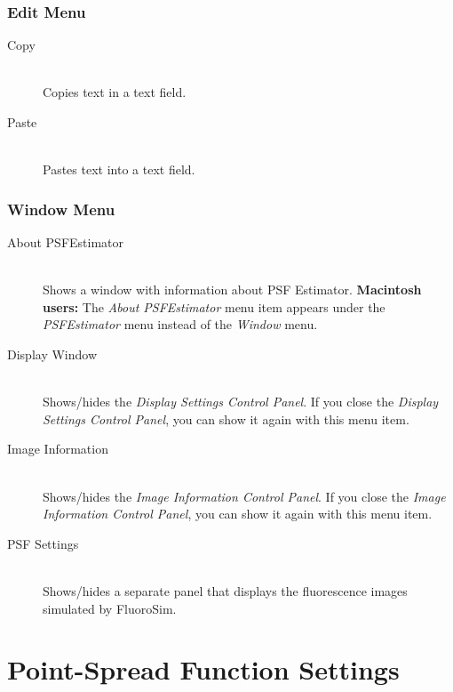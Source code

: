 \documentclass[11pt,titlepage,twoside]{article}
\begin{document}
\subsubsection{Edit Menu}

\begin{description}

  \item[Copy] \hfill \\
  Copies text in a text field.
  
  \item[Paste] \hfill \\
  Pastes text into a text field.
  
\end{description}

\subsubsection{Window Menu}

\begin{description}

  \item[About PSFEstimator] \hfill \\
  Shows a window with information about PSF Estimator. \textbf{Macintosh users:} The \emph{About PSFEstimator} menu item appears under the \emph{PSFEstimator} menu instead of the \emph{Window} menu. 

  \item[Display Window] \hfill \\
  Shows/hides the \emph{Display Settings Control Panel}. If you close the \emph{Display Settings Control Panel}, you can show it again with this menu item.
  
  \item[Image Information] \hfill \\
    Shows/hides the \emph{Image Information Control Panel}. If you close the \emph{Image Information Control Panel}, you can show it again with this menu item.
  
  \item[PSF Settings] \hfill \\
  Shows/hides a separate panel that displays the fluorescence images simulated by FluoroSim.

\end{description}

\section{Point-Spread Function Settings}
\label{sec:PointSpreadFunctionSettings}
\end{document}
